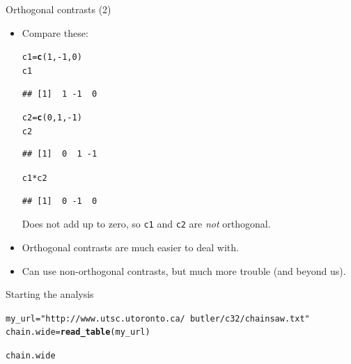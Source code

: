 \documentclass[unknownkeysallowed]{beamer}\usepackage[]{graphicx}\usepackage[]{color}
\makeatletter
\newcommand{\hlnum}[1]{\textcolor[rgb]{0.686,0.059,0.569}{#1}}%
\newcommand{\hlstr}[1]{\textcolor[rgb]{0.192,0.494,0.8}{#1}}%
\newcommand{\hlopt}[1]{\textcolor[rgb]{0,0,0}{#1}}%
\newcommand{\hlstd}[1]{\textcolor[rgb]{0.345,0.345,0.345}{#1}}%
\newcommand{\hlkwb}[1]{\textcolor[rgb]{0.69,0.353,0.396}{#1}}%
\newcommand{\hlkwd}[1]{\textcolor[rgb]{0.737,0.353,0.396}{\textbf{#1}}}%
\newenvironment{kframe}{%
 \def\at@end@of@kframe{}%
 \ifinner\ifhmode%
  \def\at@end@of@kframe{\end{minipage}}%
  \begin{minipage}{\columnwidth}%
 \fi\fi%
 \def\FrameCommand##1{\hskip\@totalleftmargin \hskip-\fboxsep
 \colorbox{shadecolor}{##1}\hskip-\fboxsep
     \hskip-\linewidth \hskip-\@totalleftmargin \hskip\columnwidth}%
 \MakeFramed {\advance\hsize-\width
   \@totalleftmargin\z@ \linewidth\hsize
   \@setminipage}}%
 {\par\unskip\endMakeFramed%
 \at@end@of@kframe}
\newenvironment{knitrout}{}{} %
\makeatother
\begin{document}
\begin{frame}[fragile]{Orthogonal contrasts (2)}
  
  \begin{itemize}
\item Compare these:
\begin{knitrout}
\color{fgcolor}\begin{kframe}
\begin{alltt}
\hlstd{c1}\hlkwb{=}\hlkwd{c}\hlstd{(}\hlnum{1}\hlstd{,}\hlopt{-}\hlnum{1}\hlstd{,}\hlnum{0}\hlstd{)}
\hlstd{c1}
\end{alltt}
\begin{verbatim}
## [1]  1 -1  0
\end{verbatim}
\begin{alltt}
\hlstd{c2}\hlkwb{=}\hlkwd{c}\hlstd{(}\hlnum{0}\hlstd{,}\hlnum{1}\hlstd{,}\hlopt{-}\hlnum{1}\hlstd{)}
\hlstd{c2}
\end{alltt}
\begin{verbatim}
## [1]  0  1 -1
\end{verbatim}
\begin{alltt}
\hlstd{c1}\hlopt{*}\hlstd{c2}
\end{alltt}
\begin{verbatim}
## [1]  0 -1  0
\end{verbatim}
\end{kframe}
\end{knitrout}
Does not add up to zero, so \texttt{c1} and \texttt{c2} are \emph{not}
orthogonal.
\item Orthogonal contrasts are much easier to deal with. 

\item Can use non-orthogonal contrasts, but much more trouble (and
  beyond us).
  \end{itemize}
\end{frame}


\begin{frame}[fragile]{Starting the analysis}
  
\begin{knitrout}\footnotesize
{}\color{fgcolor}\begin{kframe}
\begin{alltt}
\hlstd{my_url}\hlkwb{=}\hlstr{"http://www.utsc.utoronto.ca/~butler/c32/chainsaw.txt"}
\hlstd{chain.wide}\hlkwb{=}\hlkwd{read_table}\hlstd{(my_url)}
\end{alltt}


{\ttfamily\noindent\bfseries{}}\begin{alltt}
\hlstd{chain.wide}
\end{alltt}


{\ttfamily\noindent\bfseries\color{errorcolor}{\#\# Error in eval(expr, envir, enclos): object 'chain.wide' not found}}\end{kframe}
\end{knitrout}

  
\end{frame}
\end{document}
